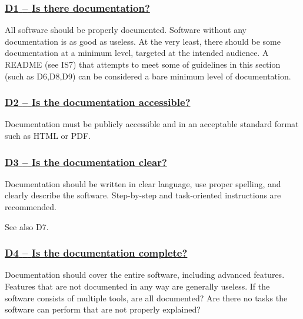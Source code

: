 \documentclass[a4paper,11pt]{article}
\newcommand{\indicator}[1]{\subsubsection*{\underline{#1}}}
\begin{document}
\newcommand{\dOneName}{D1}
\newcommand{\dOneID}{\dOneName}
\newcommand{\dOneText}{Is there documentation?}
\indicator{\dOneName{ }--{ }\dOneText}\label{id:d1}

All software should be properly documented. Software without any documentation
is as good as useless. At the very least, there should be some documentation at
a minimum level, targeted at the intended audience. A README (see IS7) that
attempts to meet some of guidelines in this section (such as D6,D8,D9) can be
considered a bare minimum level of documentation.

%
%
%

\newcommand{\dTwoName}{D2}
\newcommand{\dTwoID}{\dTwoName}
\newcommand{\dTwoText}{Is the documentation accessible?}
\indicator{\dTwoName{ }--{ }\dTwoText}\label{id:d2}

Documentation must be publicly accessible and in an acceptable standard format
such as HTML or PDF.

\newcommand{\dThreeName}{D3}
\newcommand{\dThreeID}{\dThreeName}
\newcommand{\dThreeText}{Is the documentation clear?}
\indicator{\dThreeName{ }--{ }\dThreeText}\label{id:d3}

Documentation should be written in clear language, use proper spelling, and
clearly describe the software. Step-by-step and task-oriented instructions are
recommended.

See also D7.

\newcommand{\dFourName}{D4}
\newcommand{\dFourID}{\dFourName}
\newcommand{\dFourText}{Is the documentation complete?}
\indicator{\dFourName{ }--{ }\dFourText}\label{id:d4}

Documentation should cover the entire software, including advanced features.
Features that are not documented in any way are generally useless. If the
software consists of multiple tools, are all documented? Are there no tasks the
software can perform that are not properly explained?

%
%
%
\end{document}
